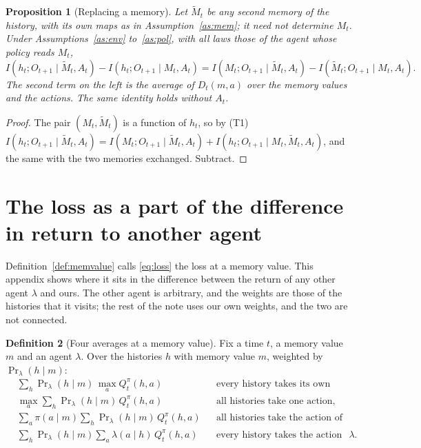 \documentclass{article}
\newtheorem{proposition}{Proposition}[section]
\theoremstyle{definition}
\newtheorem{definition}[proposition]{Definition}
\newcommand{\Prl}{\Pr\nolimits_{\lambda}}
\begin{document}
\begin{proposition}[Replacing a memory]\label{prop:replace}
Let $\tilde M_t$ be any second memory of the history, with its own maps as in Assumption~\ref{as:mem}; it need not determine $M_t$. Under Assumptions~\ref{as:env} to~\ref{as:pol}, with all laws those of the agent whose policy reads $M_t$,
\[
I(h_t;O_{t+1}\mid\tilde M_t,A_t)-I(h_t;O_{t+1}\mid M_t,A_t)=I(M_t;O_{t+1}\mid\tilde M_t,A_t)-I(\tilde M_t;O_{t+1}\mid M_t,A_t).
\]
The second term on the left is the average of $D_t(m,a)$ over the memory values and the actions. The same identity holds without $A_t$.
\end{proposition}

\begin{proof}
The pair $(M_t,\tilde M_t)$ is a function of $h_t$, so by (T1) $I(h_t;O_{t+1}\mid\tilde M_t,A_t)=I(M_t;O_{t+1}\mid\tilde M_t,A_t)+I(h_t;O_{t+1}\mid M_t,\tilde M_t,A_t)$, and the same with the two memories exchanged. Subtract.
\end{proof}

\section{The loss as a part of the difference in return to another agent}\label{sec:layer1}

Definition~\ref{def:memvalue} calls \eqref{eq:loss} the loss at a memory value. This appendix shows where it sits in the difference between the return of any other agent $\lambda$ and ours. The other agent is arbitrary, and the weights are those of the histories that it visits; the rest of the note uses our own weights, and the two are not connected.

\begin{definition}[Four averages at a memory value]\label{def:four}
Fix a time $t$, a memory value $m$ and an agent $\lambda$. Over the histories $h$ with memory value $m$, weighted by $\Prl(h\mid m)$:
\begin{align}
&\sum_h\Prl (h\mid m)\,\max_aQ^\pi_t(h,a) &&\text{every history takes its own best action,} \label{eq:own}\\
&\max_a\sum_h\Prl (h\mid m)\,Q^\pi_t(h,a) &&\text{all histories take one action, the best on average,} \label{eq:one}\\
&\sum_a\pi(a\mid m)\sum_h\Prl (h\mid m)\,Q^\pi_t(h,a) &&\text{all histories take the action of our policy,} \label{eq:pi}\\
&\sum_h\Prl (h\mid m)\sum_a\lambda(a\mid h)\,Q^\pi_t(h,a) &&\text{every history takes the action of $\lambda$.} \label{eq:lam}
\end{align}
\end{definition}
\end{document}
